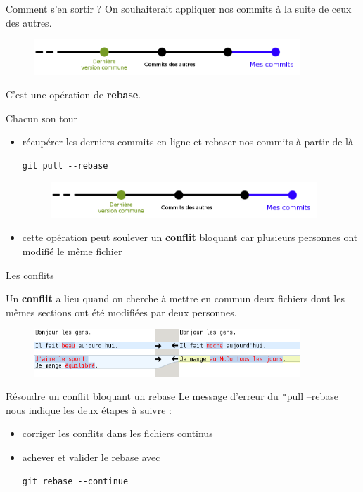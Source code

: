 \documentclass{beamer}
\begin{document}
\begin{frame}{Comment s'en sortir ?}
	On souhaiterait appliquer nos commits à la suite de ceux des autres.
	\begin{figure}
		\centering
		\includegraphics[width=10cm]{img/repo8}
	\end{figure}
	C'est une opération de \textbf{rebase}.
\end{frame}

\begin{frame}[fragile]{Chacun son tour}
	\begin{itemize}
		\item récupérer les derniers commits en ligne et rebaser nos commits à partir de là
		\begin{lstlisting}[frame=single]
		git pull --rebase
		\end{lstlisting}
		\begin{figure}
		\centering
		\includegraphics[width=10cm]{img/repo8}
		\end{figure}
		\item cette opération peut soulever un \textbf{conflit} bloquant car plusieurs personnes ont modifié le même fichier
	\end{itemize}	
\end{frame}

\begin{frame}{Les conflits}

	Un \textbf{conflit} a lieu quand on cherche à mettre en commun deux fichiers dont les mêmes sections ont été modifiées par deux personnes.  
	\begin{figure}
	\centering
	\includegraphics[width=10cm]{img/shot15}
	\end{figure}
\end{frame}

\begin{frame}[fragile]{Résoudre un conflit bloquant un rebase}
	Le message d'erreur du \texttt"{pull --rebase} nous indique les deux étapes à suivre :
	\begin{itemize}
		\item corriger les conflits dans les fichiers continus
		\item achever et valider le rebase avec
		\begin{lstlisting}[frame=single]
		git rebase --continue
		\end{lstlisting}
	\end{itemize}

\end{frame}
\end{document}
